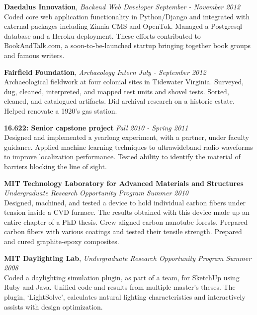 \documentclass[margin]{res}
\begin{document}
\begin{resume}
 {\bf Daedalus Innovation}, \emph{Backend Web Developer \hfill September - November 2012} \\
 Coded core web application functionality in Python/Django and integrated with external packages including Zinnia CMS and OpenTok. Managed a Postgresql database and a Heroku deployment. These efforts contributed to BookAndTalk.com, a soon-to-be-launched startup bringing together book groups and famous writers. 

 {\bf Fairfield Foundation}, 
 \emph{Archaeology Intern \hfill July - September 2012}\\
Archaeological fieldwork at four colonial sites in Tidewater Virginia. Surveyed, dug, cleaned, interpreted, and mapped test units and shovel tests. Sorted, cleaned, and catalogued artifacts. Did archival research on a historic estate. Helped renovate a 1920's gas station.

 {\bf 16.622: Senior capstone project} \hfill \emph{Fall 2010 - Spring 2011} \\
Designed and implemented a yearlong experiment, with a partner, under faculty guidance. Applied machine learning techniques to ultrawideband radio waveforms to improve localization performance. Tested ability to identify the material of barriers blocking the line of sight. 

 {\bf MIT Technology Laboratory for Advanced Materials and Structures } \\
 \emph{Undergraduate Research Opportunity Program \hfill Summer 2010}\\
Designed, machined, and tested a device to hold individual carbon fibers under tension inside a CVD furnace. The results obtained with this device made up an entire chapter of a PhD thesis. Grew aligned carbon nanotube forests. Prepared carbon fibers with various coatings and tested their tensile strength. Prepared and cured graphite-epoxy composites.

 {\bf MIT Daylighting Lab}, \emph{Undergraduate Research Opportunity Program \hfill Summer 2008}\\
Coded a daylighting simulation plugin, as part of a team, for SketchUp using Ruby and Java. Unified code and results from multiple master's theses. The plugin, `LightSolve', calculates natural lighting characteristics and interactively assists with design optimization.




\end{resume}
\end{document}
